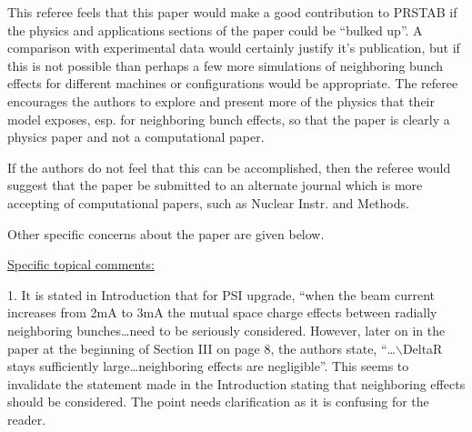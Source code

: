 \documentclass{article}
\begin{document}
 This referee feels that this paper would make a good contribution to PRSTAB 
 if the physics and applications sections of the paper could be ``bulked 
 up''. A comparison with experimental data would certainly justify it's 
 publication, but if this is not possible than perhaps a few more simulations 
 of neighboring bunch effects for different machines or configurations would 
 be appropriate. The referee encourages the authors to explore and present 
 more of the physics that their model exposes, esp. for neighboring bunch 
 effects, so that the paper is clearly a physics paper and not a 
 computational paper. 
 
 If the authors do not feel that this can be accomplished, then the referee 
 would suggest that the paper be submitted to an alternate journal which is 
 more accepting of computational papers, such as Nuclear Instr. and Methods. 
 
 Other specific concerns about the paper are given below. 
 
 \underline {Specific topical comments:}
 
 1. It is stated in Introduction that for PSI upgrade, ``when the beam 
 current increases from 2mA to 3mA the mutual space charge effects between 
 radially neighboring bunches{\ldots}need to be seriously considered. 
 However, later on in the paper at the beginning of Section III on page 8, 
 the authors state, ``{\ldots}$\backslash $DeltaR stays sufficiently 
 large{\ldots}neighboring effects are negligible''. This seems to invalidate 
 the statement made in the Introduction stating that neighboring effects 
 should be considered. The point needs clarification as it is confusing for 
 the reader. 
 
\end{document}
